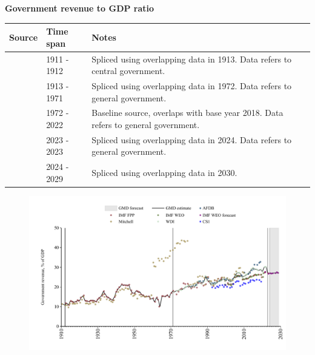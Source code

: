 \documentclass[12pt,a4paper,landscape]{article}
\begin{document}
\begin{adjustbox}{max totalsize={\paperwidth}{\paperheight},center}
\begin{minipage}[t][\textheight][t]{\textwidth}
\vspace*{0.5cm}
{}
\begin{center}
{\Large\bfseries Government revenue to GDP ratio}
\end{center}
\vspace{0.5cm}
\begin{table}[H]
\centering
\small
\begin{tabular}{|l|l|l|}
\hline
\textbf{Source} & \textbf{Time span} & \textbf{Notes} \\
\hline
\rowcolor{white}\cite{Mitchell}& 1911 - 1912 &Spliced using overlapping data in 1913. Data refers to central government.\\
\rowcolor{lightgray}\cite{IMF_FPP}& 1913 - 1971 &Spliced using overlapping data in 1972. Data refers to general government.\\
\rowcolor{white}\cite{WDI}& 1972 - 2022 &Baseline source, overlaps with base year 2018. Data refers to general government.\\
\rowcolor{lightgray}\cite{IMF_FPP}& 2023 - 2023 &Spliced using overlapping data in 2024. Data refers to general government.\\
\rowcolor{white}\cite{IMF_WEO_forecast}& 2024 - 2029 &Spliced using overlapping data in 2030. \\
\hline
\end{tabular}
\end{table}
\begin{figure}[H]
\centering
\includegraphics[width=\textwidth,height=0.6\textheight,keepaspectratio]{graphs/ZAF_govrev_GDP.pdf}
\end{figure}
\end{minipage}
\end{adjustbox}
\end{document}
